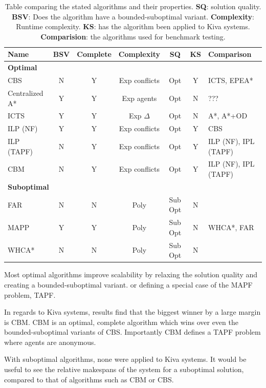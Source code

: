 \documentclass[a4paper,11pt]{article}
\begin{document}
\begin{table}
	\centering
	\small
	\begin{tabular}{ l c c c c c p{2.3cm}}
		
		\textbf{Name} & \textbf{BSV} & \textbf{Complete} & \textbf{Complexity} & \textbf{SQ} & \textbf{KS} & \textbf{Comparison} \\
		\hline
		\multicolumn{7}{l}{\textbf{Optimal}} \\
		\hline
		CBS 				& N & Y & Exp conflicts & Opt & Y & ICTS, EPEA* \\
		Centralized A* 		& Y & Y & Exp agents & Opt & N & ??? \\
		ICTS 				& Y & Y & Exp $\Delta$ & Opt & N & A*, A*+OD \\
		ILP	(NF)			& Y & Y & Exp conflicts & Opt & Y & CBS \\
		ILP	(TAPF)			& N & Y & Exp conflicts & Opt & Y & ILP (NF), IPL (TAPF) \\
		CBM 				& N & Y & Exp conflicts & Opt & Y & ILP (NF), IPL (TAPF) \\
		\hline
		\multicolumn{7}{l}{\textbf{Suboptimal}} \\
		\hline
		FAR  				& N & N & Poly & Sub Opt & N & \\
		MAPP 				& Y & Y & Poly & Sub Opt & N & WHCA*, FAR \\
		WHCA* 				& N & N & Poly & Sub Opt & N & \\
	\end{tabular}

	\caption{Table comparing the stated algorithms and their properties. \textbf{SQ}: solution quality. \textbf{BSV}: Does the algorithm have a bounded-suboptimal variant. \textbf{Complexity}: Runtime complexity. \textbf{KS}: has the algorithm been applied to Kiva systems. \textbf{Comparision}: the algorithms used for benchmark testing.}
	\label{table:comparison}
\end{table}


Most optimal algorithms improve scalability by relaxing the solution quality and creating a bounded-suboptimal variant. or defining a special case of the MAPF problem, TAPF.


In regards to Kiva systems, results find that the biggest winner by a large margin is CBM. CBM is an optimal, complete algorithm which wins over even the bounded-suboptimal variants of CBS. Importantly CBM defines a TAPF problem where agents are anonymous.

With suboptimal algorithms, none were applied to Kiva systems. It would be useful to see the relative makespans of the system for a suboptimal solution, compared to that of algorithms such as CBM or CBS.
\end{document}
